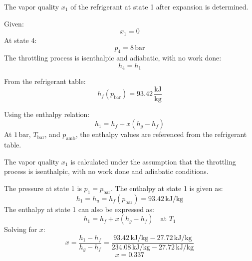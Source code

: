 The vapor quality \( x_1 \) of the refrigerant at state 1 after expansion is determined.  

Given:  
\[
x_1 = 0
\]  
At state 4:  
\[
p_4 = 8 \, \text{bar}
\]  
The throttling process is isenthalpic and adiabatic, with no work done:  
\[
h_4 = h_1
\]  

From the refrigerant table:  
\[
h_f(p_{\text{bar}}) = 93.42 \, \frac{\text{kJ}}{\text{kg}}
\]  

Using the enthalpy relation:  
\[
h_1 = h_f + x(h_g - h_f)
\]  
At \( 1 \, \text{bar} \), \( T_{\text{bar}} \), and \( p_{\text{amb}} \), the enthalpy values are referenced from the refrigerant table.

The vapor quality \( x_1 \) is calculated under the assumption that the throttling process is isenthalpic, with no work done and adiabatic conditions.  

The pressure at state 1 is \( p_1 = p_{\text{bar}} \).  
The enthalpy at state 1 is given as:  
\[
h_1 = h_u = h_f(p_{\text{bar}}) = 93.42 \, \text{kJ/kg}
\]  
The enthalpy at state 1 can also be expressed as:  
\[
h_1 = h_f + x(h_g - h_f) \quad \text{at } T_1
\]  
Solving for \( x \):  
\[
x = \frac{h_1 - h_f}{h_g - h_f} = \frac{93.42 \, \text{kJ/kg} - 27.72 \, \text{kJ/kg}}{234.08 \, \text{kJ/kg} - 27.72 \, \text{kJ/kg}}
\]  
\[
x = 0.337
\]